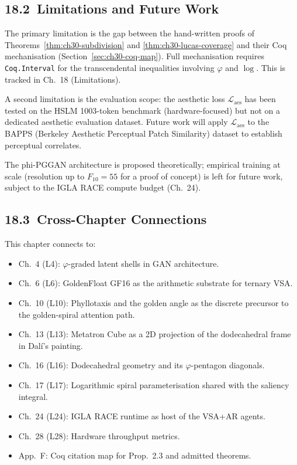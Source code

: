 \subsection{18.2\ Limitations and
  Future Work}\label{subsec:ch30-limitations}

The primary limitation is the gap between the
hand-written proofs of
Theorems~\ref{thm:ch30-subdivision} and
\ref{thm:ch30-lucas-coverage} and their Coq
mechanisation (Section~\ref{sec:ch30-coq-map}).
Full mechanisation requires
\texttt{Coq.Interval} for the transcendental
inequalities involving $\varphi$ and $\log$.
This is tracked in Ch.~18 (Limitations).

A second limitation is the evaluation scope:
the aesthetic loss $\mathcal{L}_{\text{aes}}$
has been tested on the HSLM 1003-token benchmark
(hardware-focused) but not on a dedicated
aesthetic evaluation dataset.  Future work will
apply $\mathcal{L}_{\text{aes}}$ to the
BAPPS (Berkeley Aesthetic Perceptual Patch
Similarity) dataset
\cite{cohenor_stylization} to establish
perceptual correlates.

The phi-PGGAN architecture is proposed
theoretically; empirical training at scale
(resolution up to $F_{10} = 55$ for a proof of
concept) is left for future work, subject to the
IGLA RACE compute budget (Ch.~24).

\subsection{18.3\ Cross-Chapter
  Connections}\label{subsec:ch30-cross}

This chapter connects to:
\begin{itemize}
  \item Ch.~4 (L4): $\varphi$-graded latent shells
    in GAN architecture.
  \item Ch.~6 (L6): GoldenFloat GF16 as the
    arithmetic substrate for ternary VSA.
  \item Ch.~10 (L10): Phyllotaxis and the golden
    angle as the discrete precursor to the
    golden-spiral attention path.
  \item Ch.~13 (L13): Metatron Cube as a 2D
    projection of the dodecahedral frame in
    Dal\'{i}'s painting.
  \item Ch.~16 (L16): Dodecahedral geometry and
    its $\varphi$-pentagon diagonals.
  \item Ch.~17 (L17): Logarithmic spiral
    parameterisation shared with the saliency
    integral.
  \item Ch.~24 (L24): IGLA RACE runtime as host
    of the VSA+AR agents.
  \item Ch.~28 (L28): Hardware throughput metrics.
  \item App.~F: Coq citation map for
    Prop.~2.3 and admitted theorems.
\end{itemize}

